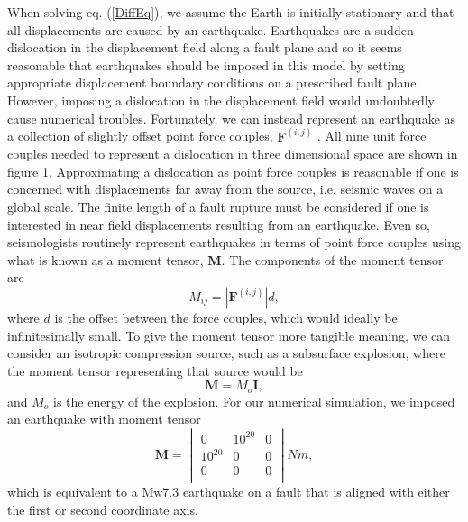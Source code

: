 \documentclass[12pt]{article}
\begin{document}
When solving eq. (\ref{DiffEq}), we assume the Earth is initially
stationary and that all displacements are caused by an earthquake.
Earthquakes are a sudden dislocation in the displacement field along a
fault plane and so it seems reasonable that earthquakes should be
imposed in this model by setting appropriate displacement boundary
conditions on a prescribed fault plane.  However, imposing a
dislocation in the displacement field would undoubtedly cause
numerical troubles.  Fortunately, we can instead represent an
earthquake as a collection of slightly offset point force couples,
$\boldsymbol{F}^{(i,j)}$ \citep{AR2002}.  All nine unit force
couples needed to represent a dislocation in three dimensional space
are shown in figure 1. Approximating a dislocation as point force
couples is reasonable if one is concerned with displacements far away
from the source, i.e. seismic waves on a global scale.  The finite
length of a fault rupture must be considered if one is interested in
near field displacements resulting from an earthquake.  Even so,
seismologists routinely represent earthquakes in terms of point force
couples using what is known as a moment tensor, $\boldsymbol{M}$.  The
components of the moment tensor are
\begin{equation}\label{MomentTensorComponents}
  M_{ij} = |\boldsymbol{F}^{(i,j)}|d,
\end{equation}
where $d$ is the offset between the force couples, which would ideally
be infinitesimally small.  To give the moment tensor more tangible
meaning, we can consider an isotropic compression source, such as a
subsurface explosion, where the moment tensor representing that source
would be
\begin{equation}
  \boldsymbol{M} = M_o\boldsymbol{I},
\end{equation}
and $M_o$ is the energy of the explosion. For our numerical
simulation, we imposed an earthquake with moment tensor
\begin{equation}
  \boldsymbol{M} = 
  \begin{vmatrix}
  0&10^{20}&0 \\
  10^{20}&0&0 \\
  0&0&0 \\
  \end{vmatrix} N m,
\end{equation}
which is equivalent to a Mw7.3 earthquake on a fault that is aligned
with either the first or second coordinate axis.  
\end{document}
